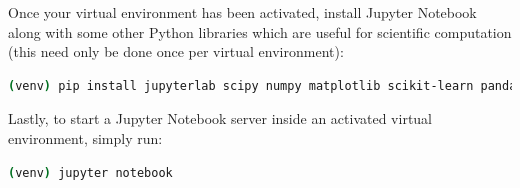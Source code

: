 \documentclass[12pt]{article}
\begin{document}
Once your virtual environment has been activated, install Jupyter Notebook along with some other
Python libraries which are useful for scientific computation (this need only be done once per virtual
environment):

\begin{lstlisting}[language=bash, caption=Computational Python Libraries (MacOS/Linux)]
(venv) pip install jupyterlab scipy numpy matplotlib scikit-learn pandas ipywidgets
\end{lstlisting}

Lastly, to start a Jupyter Notebook server inside an activated virtual environment, simply run:

\begin{lstlisting}[language=bash, caption=Start Jupyter Server (MacOS/Linux)]
(venv) jupyter notebook
\end{lstlisting}
\end{document}
